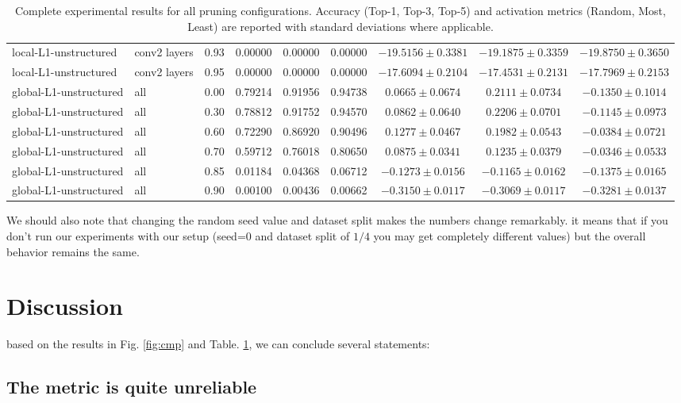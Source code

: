 \begin{table}[!htb]
\begin{tabular}{l l c c c c c c c}
local-L1-unstructured & conv2 layers & 0.93 & 0.00000 & 0.00000 & 0.00000 & $-19.5156\pm0.3381$ & $-19.1875\pm0.3359$ & $-19.8750\pm0.3650$ \\
local-L1-unstructured & conv2 layers & 0.95 & 0.00000 & 0.00000 & 0.00000 & $-17.6094\pm0.2104$ & $-17.4531\pm0.2131$ & $-17.7969\pm0.2153$ \\
\midrule
global-L1-unstructured & all & 0.00 & 0.79214 & 0.91956 & 0.94738 & $0.0665\pm0.0674$ & $0.2111\pm0.0734$ & $-0.1350\pm0.1014$ \\
global-L1-unstructured & all & 0.30 & 0.78812 & 0.91752 & 0.94570 & $0.0862\pm0.0640$ & $0.2206\pm0.0701$ & $-0.1145\pm0.0973$ \\
global-L1-unstructured & all & 0.60 & 0.72290 & 0.86920 & 0.90496 & $0.1277\pm0.0467$ & $0.1982\pm0.0543$ & $-0.0384\pm0.0721$ \\
global-L1-unstructured & all & 0.70 & 0.59712 & 0.76018 & 0.80650 & $0.0875\pm0.0341$ & $0.1235\pm0.0379$ & $-0.0346\pm0.0533$ \\
global-L1-unstructured & all & 0.85 & 0.01184 & 0.04368 & 0.06712 & $-0.1273\pm0.0156$ & $-0.1165\pm0.0162$ & $-0.1375\pm0.0165$ \\
global-L1-unstructured & all & 0.90 & 0.00100 & 0.00436 & 0.00662 & $-0.3150\pm0.0117$ & $-0.3069\pm0.0117$ & $-0.3281\pm0.0137$ \\
\bottomrule
\end{tabular}
\caption{Complete experimental results for all pruning configurations. Accuracy (Top-1, Top-3, Top-5) and activation metrics (Random, Most, Least) are reported with standard deviations where applicable.}
\label{tab:all}
\end{table}


We should also note that changing the random seed value and dataset split makes the numbers change remarkably. it means that if you don't run our experiments with our setup (seed=0 and dataset split of  \(1/4\)  you may get completely different values) but the overall behavior remains the same.

\section{\textbf{Discussion}}

based on the results in Fig. \ref{fig:cmp} and Table. \ref{tab:all}, we can conclude several statements:

\subsection{\textbf{The metric is quite unreliable}}

